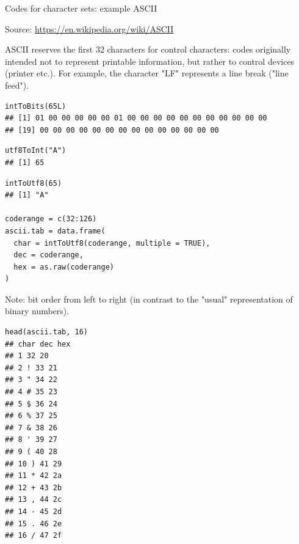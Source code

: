 \documentclass[11pt,compress,t,notes=noshow, xcolor=table]{beamer}
\begin{document}
\begin{vbframe}{Codes for character sets: example ASCII}
\begin{center}
{\scriptsize Source: \url{https://en.wikipedia.org/wiki/ASCII}}
\end{center}

{\footnotesize ASCII reserves the first 32 characters for control characters: codes originally intended not to represent printable information, but rather to control devices (printer etc.).
For example, the character "LF" represents a line break ("line feed").}

\framebreak
\vspace*{-0.5cm}
\footnotesize
\begin{verbatim}
intToBits(65L)
## [1] 01 00 00 00 00 00 01 00 00 00 00 00 00 00 00 00 00 00
## [19] 00 00 00 00 00 00 00 00 00 00 00 00 00 00
\end{verbatim}

\vspace{0.5mm}
\begin{verbatim}
utf8ToInt("A")
## [1] 65
\end{verbatim}

\vspace{0.5mm}
\begin{verbatim}
intToUtf8(65)
## [1] "A"

coderange = c(32:126)
ascii.tab = data.frame(
  char = intToUtf8(coderange, multiple = TRUE),
  dec = coderange,
  hex = as.raw(coderange)
)
\end{verbatim}

\begin{footnotesize}
Note: bit order from left to right (in contrast to the "usual" representation of binary numbers).
\end{footnotesize}

\framebreak

\footnotesize
\begin{verbatim}
head(ascii.tab, 16)
## char dec hex
## 1 32 20
## 2 ! 33 21
## 3 " 34 22
## 4 # 35 23
## 5 $ 36 24
## 6 % 37 25
## 7 & 38 26
## 8 ' 39 27
## 9 ( 40 28
## 10 ) 41 29
## 11 * 42 2a
## 12 + 43 2b
## 13 , 44 2c
## 14 - 45 2d
## 15 . 46 2e
## 16 / 47 2f
\end{verbatim}

\end{vbframe}



\normalsize
\end{document}
